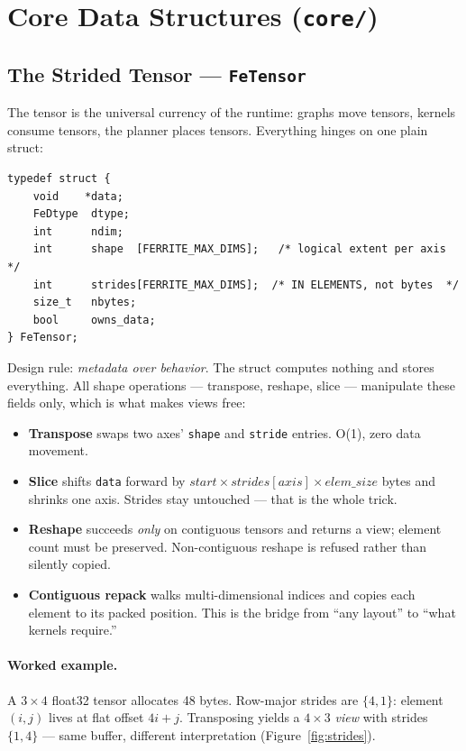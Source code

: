 \documentclass[11pt,a4paper]{article}
\begin{document}
\section{Core Data Structures (\texttt{core/})}

\subsection{The Strided Tensor --- \texttt{FeTensor}}

The tensor is the universal currency of the runtime: graphs move tensors,
kernels consume tensors, the planner places tensors. Everything hinges on one
plain struct:

\begin{lstlisting}[style=cstyle,caption={core/tensor.h --- the entire tensor abstraction}]
typedef struct {
    void    *data;
    FeDtype  dtype;
    int      ndim;
    int      shape  [FERRITE_MAX_DIMS];   /* logical extent per axis */
    int      strides[FERRITE_MAX_DIMS];  /* IN ELEMENTS, not bytes  */
    size_t   nbytes;
    bool     owns_data;
} FeTensor;
\end{lstlisting}

Design rule: \emph{metadata over behavior}. The struct computes nothing and
stores everything. All shape operations --- transpose, reshape, slice ---
manipulate these fields only, which is what makes views free:

\begin{itemize}[itemsep=2pt]
\item \textbf{Transpose} swaps two axes' \texttt{shape} and \texttt{stride}
      entries. O(1), zero data movement.
\item \textbf{Slice} shifts \texttt{data} forward by
      $start \times strides[axis] \times elem\_size$ bytes and shrinks one axis.
      Strides stay untouched --- that is the whole trick.
\item \textbf{Reshape} succeeds \emph{only} on contiguous tensors and returns a
      view; element count must be preserved. Non-contiguous reshape is refused
      rather than silently copied.
\item \textbf{Contiguous repack} walks multi-dimensional indices and copies each
      element to its packed position. This is the bridge from ``any layout'' to
      ``what kernels require.''
\end{itemize}

\paragraph{Worked example.} A $3\times4$ float32 tensor allocates 48 bytes.
Row-major strides are $\{4,1\}$: element $(i,j)$ lives at flat offset
$4i + j$. Transposing yields a $4\times3$ \emph{view} with strides $\{1,4\}$ ---
same buffer, different interpretation (Figure~\ref{fig:strides}).
\end{document}
